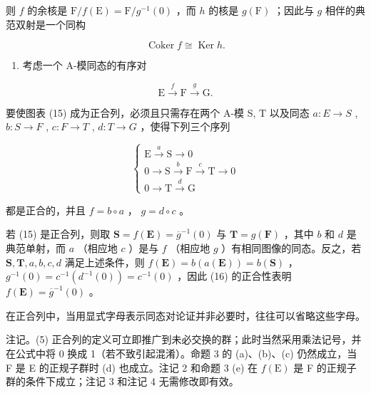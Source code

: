 则 \(f\) 的余核是 \(\mathrm{F} / f(\mathrm{E}) = \mathrm{F} / g^{-1}(0)\) ，而 \(h\) 的核是 \(g(\mathrm{F})\) ；因此与 \(g\) 相伴的典范双射是一个同构

\[
\operatorname{Coker} f \cong \operatorname{Ker} h.
\]

\begin{enumerate}
\def\labelenumi{(\arabic{enumi})}
\setcounter{enumi}{3}
\tightlist
\item
  考虑一个 A-模同态的有序对
\end{enumerate}

\[
\mathrm{E} \xrightarrow {f} \mathrm{F} \xrightarrow {g} \mathrm{G}.\tag{15}
\]

要使图表 (15) 成为正合列，必须且只需存在两个 A-模 S, T 以及同态 \(a:E\to S\) , \(b:S\to F\) , \(c:F\to T\) , \(d:T\to G\) ，使得下列三个序列

\[
\left\{ \begin{array}{c} \mathrm{E} \xrightarrow {a} \mathrm{S} \longrightarrow 0 \\ 0 \longrightarrow \mathrm{S} \xrightarrow {b} \mathrm{F} \xrightarrow {c} \mathrm{T} \longrightarrow 0 \\ 0 \longrightarrow \mathrm{T} \xrightarrow {d} \mathrm{G} \end{array} \right.\tag{16}
\]

都是正合的，并且 \(f = b \circ a\) ， \(g = d \circ c\) 。

若 (15) 是正合列，则取 \(\mathbf{S} = f(\mathbf{E}) = \overline{g}^{-1}(0)\) 与 \(\mathbf{T} = g(\mathbf{F})\) ，其中 \(b\) 和 \(d\) 是典范单射，而 \(a\) （相应地 \(c\) ）是与 \(f\) （相应地 \(g\) ）有相同图像的同态。反之，若 \(\mathbf{S}, \mathbf{T}, a, b, c, d\) 满足上述条件，则 \(f(\mathbf{E}) = b(a(\mathbf{E})) = b(\mathbf{S})\) ， \(g^{-1}(0) = c^{-1}(d^{-1}(0)) = c^{-1}(0)\) ，因此 (16) 的正合性表明 \(f(\mathbf{E}) = \overline{g}^{-1}(0)\) 。

在正合列中，当用显式字母表示同态对论证并非必要时，往往可以省略这些字母。

注记。(5) 正合列的定义可立即推广到未必交换的群；此时当然采用乘法记号，并在公式中将 0 换成 1（若不致引起混淆）。命题 3 的 (a)、(b)、(c) 仍然成立，当 F 是 E 的正规子群时 (d) 也成立。注记 2 和命题 3 (e) 在 \(f(\mathrm{E})\) 是 F 的正规子群的条件下成立；注记 3 和注记 4 无需修改即有效。

